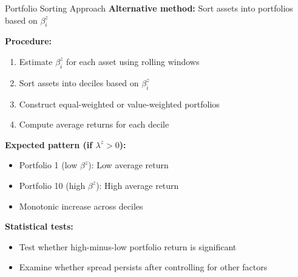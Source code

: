 \documentclass{beamer}
\begin{document}
\begin{frame}{Portfolio Sorting Approach}
\textbf{Alternative method:} Sort assets into portfolios based on $\beta_i^z$

\vspace{0.3cm}
\textbf{Procedure:}
\begin{enumerate}
\item Estimate $\beta_i^z$ for each asset using rolling windows
\item Sort assets into deciles based on $\beta_i^z$
\item Construct equal-weighted or value-weighted portfolios
\item Compute average returns for each decile
\end{enumerate}

\vspace{0.3cm}
\textbf{Expected pattern (if $\lambda^z > 0$):}
\begin{itemize}
\item Portfolio 1 (low $\beta^z$): Low average return
\item Portfolio 10 (high $\beta^z$): High average return
\item Monotonic increase across deciles
\end{itemize}

\vspace{0.3cm}
\textbf{Statistical tests:}
\begin{itemize}
\item Test whether high-minus-low portfolio return is significant
\item Examine whether spread persists after controlling for other factors
\end{itemize}
\end{frame}
\end{document}
